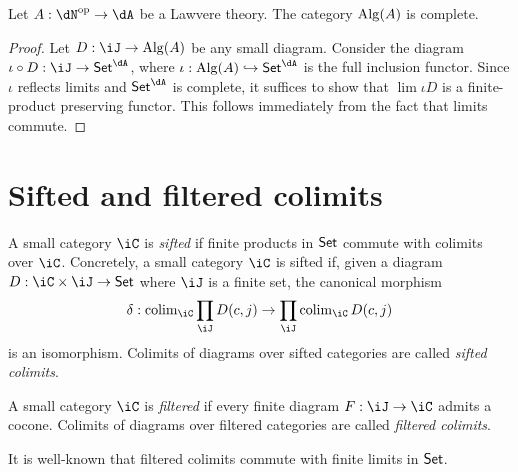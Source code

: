 \documentclass{zett}
\begin{document}
\begin{thm}
  Let $A : \dN\op \to \dA$ be a Lawvere theory.
  The category $\operatorname{Alg}(A)$ is complete.
\end{thm}
\begin{proof}
  Let $D : \iJ \to \Alg(A)$ be any small diagram.
  Consider the diagram $\iota \circ D : \iJ \to \CSet^{\dA}$, where $\iota : \Alg(A) \into \CSet^{\dA}$ is the full inclusion functor.
  Since $\iota$ reflects limits and $\CSet^{\dA}$ is complete, it suffices to show that $\lim \iota D$ is a finite-product preserving functor.
  This follows immediately from the fact that limits commute.
\end{proof}

\section{Sifted and filtered colimits}
\label{sec:sifted-and-filtered-colimits}

\begin{defn}\label{defn:sifted-categories}
  A small category $\iC$ is \emph{sifted} if finite products in $\mathsf{Set}$ commute with colimits over $\iC$.
  Concretely, a small category $\iC$ is sifted if, given a diagram $D : \iC \times \iJ \to \CSet$ where $\iJ$ is a finite set, the canonical morphism
  \[
    \delta : \colim_{\iC}\prod_{\iJ}D(c,j) \to \prod_{\iJ}\colim_{\iC}D(c,j)
  \]
  is an isomorphism.
  Colimits of diagrams over sifted categories are called \emph{sifted colimits}.
\end{defn}

\begin{defn}
  A small category $\iC$ is \emph{filtered} if every finite diagram $F : \iJ \to \iC$ admits a cocone.
  Colimits of diagrams over filtered categories are called \emph{filtered colimits}.
\end{defn}

\begin{node}
  It is well-known that filtered colimits commute with finite limits in $\mathsf{Set}$.
\end{node}
\end{document}
